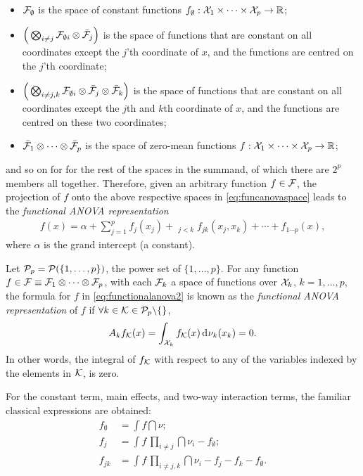 \begin{itemize}
  \item ${\mathcal F}_{\emptyset}$ is the space of constant functions $f_\emptyset:{\mathcal X}_1\times\cdots\times{\mathcal X}_p\to\mathbb{R}$;
  \item $\Big( \bigotimes_{i\neq j}{\mathcal F}_{\emptyset i} \otimes \bar{{\mathcal F}}_j \Big)$ is the space of functions that are constant on all coordinates except the $j$'th coordinate of $x$, and the functions are centred on the $j$'th coordinate;
  \item $\Big( \bigotimes_{i\neq j,k}{\mathcal F}_{\emptyset i} \otimes \bar{{\mathcal F}}_j \otimes \bar{{\mathcal F}}_k \Big)$ is the space of functions that are constant on all coordinates except the $j$th and $k$th coordinate of $x$, and the functions are centred on these two coordinates;
  \item $\bar{{\mathcal F}}_1 \otimes \cdots \otimes \bar{{\mathcal F}}_p$ is the space of zero-mean functions $f:{\mathcal X}_1\times\cdots\times{\mathcal X}_p\to\mathbb{R}$;
\end{itemize}
and so on for for the rest of the spaces in the summand, of which there are $2^p$ members all together. 
Therefore, given an arbitrary function $f\in{\mathcal F}$, the projection of $f$ onto the above respective 
spaces in \cref{eq:funcanovaspace} leads to the \emph{functional ANOVA representation}
\begin{align}\label{eq:functionalanova2}
  f(x) = \alpha + \sum_{j=1}^p f_j(x_j) + \mathop{\sum_{j,k=1}^p}_{j<k} f_{jk}(x_j,x_k) + \cdots + f_{1\cdots p}(x),
\end{align}
where $\alpha$ is the grand intercept (a constant).

\begin{definition}
  Let ${\mathcal P}_p = {\mathcal P}(\{1,\dots,p\})$, the power set of $\{1,\dots,p\}$.
  For any function $f \in {\mathcal F}\equiv{\mathcal F}_1\otimes\cdots\otimes{\mathcal F}_p$, with each ${\mathcal F}_k$ a space of functions over ${\mathcal X}_k$, $k=1,\dots,p$, the formula for $f$ in \cref{eq:functionalanova2} is known as the \emph{functional ANOVA representation} of $f$ if $\forall k \in {\mathcal K} \in {\mathcal P}_p \backslash \{ \}$,
  \begin{align}\label{eq:funcanovaorth}
    A_k f_{\mathcal K}(x) = \int_{{\mathcal X}_k} f_{\mathcal K}(x) \operatorname{d}\hspace{0.5pt}\!\nu_k(x_k) = 0.
  \end{align}
  In other words, the integral of $f_{\mathcal K}$ with respect to any of the variables indexed by the elements in ${\mathcal K}$, is zero. 
\end{definition}

For the constant term, main effects, and two-way interaction terms, the familiar classical expressions are obtained:
\begin{align*}
  f_\emptyset &= \int f \dint\nu; \\
  f_j &= \int f \, \textstyle\prod_{i\neq j} \dint\nu_i  - f_\emptyset; \\
  f_{jk} &= \int f \, \textstyle\prod_{i\neq j,k} \dint\nu_i  - f_j - f_k - f_\emptyset.
\end{align*}

